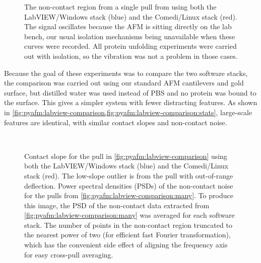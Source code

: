 \begin{figure}
  \ContinuedFloat
  \begin{center}
    \caption{\protect{}The
      non-contact region from a single pull from
      \protect{} using both
      the LabVIEW/Windows stack (blue) and the Comedi/Linux stack
      (red).  The signal oscillates because the AFM is sitting
      directly on the lab bench, our usual isolation mechanisms being
      unavailable when these curves were recorded.  All protein
      unfolding experiments were carried out with isolation, so the
      vibration was not a problem in those cases.}
  \end{center}
\end{figure}

Because the goal of these experiments was to compare the two software
stacks, the comparison was carried out using our standard AFM
cantilevers and gold surface, but distilled water was used instead of
PBS and no protein was bound to the surface.  This gives a simpler
system with fewer distracting features.  As shown in
\cref{fig:pyafm:labview-comparison,fig:pyafm:labview-comparison:stats},
large-scale features are identical, with similar contact slopes and
non-contact noise.

\begin{figure}
  \begin{center}
     \\
    \caption{\protect{}Contact
      slope for the pull in \cref{fig:pyafm:labview-comparison} using
      both the LabVIEW/Windows stack (blue) and the Comedi/Linux stack
      (red).  The low-slope outlier is from the pull with out-of-range
      deflection.
      \protect{}Power
      spectral densities (PSDs) of the non-contact noise for the pulls
      from \ref{fig:pyafm:labview-comparison:many}.  To produce this
      image, the PSD of the non-contact data extracted from
      \ref{fig:pyafm:labview-comparison:many} was averaged for each
      software stack.  The number of points in the non-contact region
      truncated to the nearest power of two (for efficient fast
      Fourier transformation), which has the convenient side effect of
      aligning the frequency axis for easy cross-pull
      averaging.\label{fig:pyafm:labview-comparison:stats}}
  \end{center}
\end{figure}

